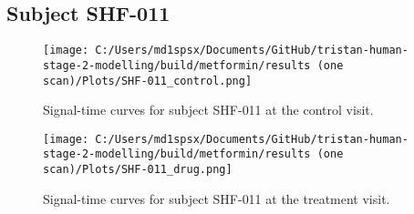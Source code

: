 \documentclass{epflreport}%
\begin{document}
\subsection{Subject SHF{-}011}%
\label{subsec:SubjectSHF{-}011}%

%


\begin{figure}[h!]%
\centering%
\texttt{[image: C:/Users/md1spsx/Documents/GitHub/tristan-human-stage-2-modelling/build/metformin/results (one scan)/Plots/SHF-011\_control.png]}%
\caption{Signal{-}time curves for subject SHF{-}011 at the control visit.}%
\end{figure}

%


\begin{figure}[h!]%
\centering%
\texttt{[image: C:/Users/md1spsx/Documents/GitHub/tristan-human-stage-2-modelling/build/metformin/results (one scan)/Plots/SHF-011\_drug.png]}%
\caption{Signal{-}time curves for subject SHF{-}011 at the treatment visit.}%
\end{figure}
\end{document}
